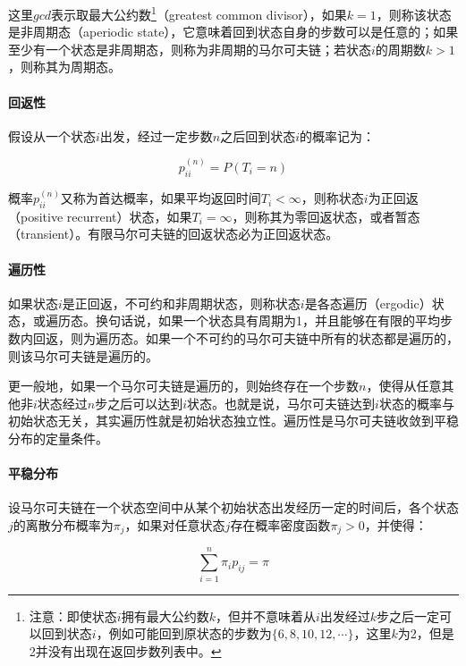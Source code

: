 这里$gcd$表示取最大公约数\footnote{注意：即使状态$i$拥有最大公约数$k$，但并不意味着从$i$出发经过$k$步之后一定可以回到状态$i$，例如可能回到原状态的步数为$\{6,8,10,12,\cdots\}$，这里$k$为2，但是2并没有出现在返回步数列表中。}（greatest common divisor），如果$k=1$，则称该状态是非周期态（aperiodic state），它意味着回到状态自身的步数可以是任意的；如果至少有一个状态是非周期态，则称为非周期的马尔可夫链；若状态$i$的周期数$k>1$，则称其为周期态。



\paragraph{回返性}
假设从一个状态$i$出发，经过一定步数$n$之后回到状态$i$的概率记为：

\begin{equation}
	p^{(n)}_{ii}=P(T_i=n)
\end{equation}

\noindent 概率$p^{(n)}_{ii}$又称为首达概率，如果平均返回时间$T_i<\infty$，则称状态$i$为正回返（positive recurrent）状态，如果$T_i=\infty$，则称其为零回返状态，或者暂态（transient）。有限马尔可夫链的回返状态必为正回返状态。




\paragraph{遍历性}
如果状态$i$是正回返，不可约和非周期状态，则称状态$i$是各态遍历（ergodic）状态，或遍历态。换句话说，如果一个状态具有周期为1，并且能够在有限的平均步数内回返，则为遍历态。如果一个不可约的马尔可夫链中所有的状态都是遍历的，则该马尔可夫链是遍历的。

更一般地，如果一个马尔可夫链是遍历的，则始终存在一个步数$n$，使得从任意其他非$i$状态经过$n$步之后可以达到$i$状态。也就是说，马尔可夫链达到$i$状态的概率与初始状态无关，其实遍历性就是初始状态独立性。遍历性是马尔可夫链收敛到平稳分布的定量条件。




\paragraph{平稳分布}
设马尔可夫链在一个状态空间中从某个初始状态出发经历一定的时间后，各个状态$j$的离散分布概率为$\pi_{j}$，如果对任意状态$j$存在概率密度函数$\pi_j>0$，并使得：

\begin{equation}
	\sum^{n}_{i=1}\pi_i p_{ij}=\pi
\end{equation}

